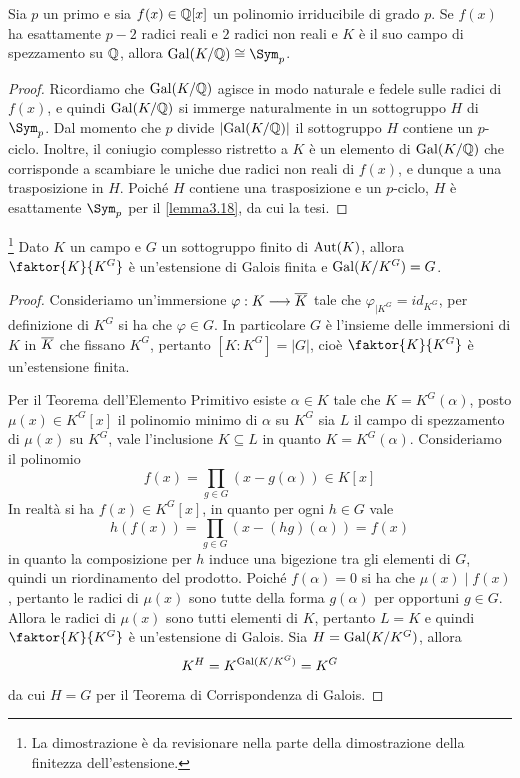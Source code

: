 \documentclass[11pt]{scrartcl}
\begin{document}
	\begin{lemma}
		\label{lemma3.19}
		Sia $p$ un primo e sia $f(x) \in \mathbb Q[x]$ un polinomio irriducibile di grado
		$p$. Se $f(x)$ ha esattamente $p - 2$ radici reali e $2$ radici non reali
		e $K$ è il suo campo di spezzamento su $\mathbb Q$, allora $\Gal(K/\QQ) \cong \Sym_p$.
	\end{lemma}
	
	\begin{proof}
		Ricordiamo che $\operatorname{Gal}(K/\mathbb Q)$ agisce in modo naturale e fedele sulle radici di
		$f(x)$, e quindi $\operatorname{Gal}(K/\mathbb Q)$ si immerge naturalmente in un sottogruppo
		$H$ di
		$\Sym_p$. Dal momento che $p$ divide $\left\lvert \operatorname{Gal}(K/\mathbb Q) \right\rvert$ il sottogruppo $H$
		contiene
		un $p$-ciclo. Inoltre, il coniugio complesso ristretto a $K$ è
		un elemento di $\operatorname{Gal}(K/\mathbb Q)$ che corrisponde a scambiare le uniche due
		radici non reali di $f(x)$, e dunque a una trasposizione in $H$. Poiché
		$H$ contiene una trasposizione e un $p$-ciclo,
		$H$ è esattamente $\Sym_p$ per il \autoref{lemma3.18}, da cui la tesi.
	\end{proof}
	
	\begin{lemma}
		\footnote{
			La dimostrazione è da revisionare nella parte della dimostrazione 
			della finitezza dell'estensione.
		}
		\label{lemma3.20}
		Dato $K$ un campo e $G$ un sottogruppo finito di $\operatorname{Aut}(K)$, allora 
		$\faktor{K}{K^G}$ è un'estensione di Galois finita e $\operatorname{Gal}(K/K^G) = G$.
	\end{lemma}
	
	\begin{proof}
		Consideriamo un'immersione $\varphi: K \longrightarrow \overline{K}$ tale che
		$\varphi_{\mid K^G} = id_{K^G}$, per definizione di $K^G$ si ha che 
		$\varphi \in G$. In particolare $G$ è l'insieme delle immersioni di $K$
		in $\overline{K}$ che fissano $K^G$, pertanto $[K:K^G] = |G|$, cioè $\faktor{K}{K^G}$
		è un'estensione finita. 
		
		Per il Teorema dell'Elemento Primitivo esiste $\alpha \in K$ tale che 
		$K = K^G(\alpha)$, posto $\mu(x) \in K^G[x]$ il polinomio minimo di $\alpha$
		su $K^G$ sia $L$ il campo di spezzamento di $\mu(x)$ su $K^G$, vale
		l'inclusione $K \subseteq L$ in quanto $K = K^G(\alpha)$. Consideriamo 
		il polinomio 
		\[
		f(x) = \prod_{g \in G}(x - g(\alpha)) \in K[x]
		\]
		In realtà si ha $f(x) \in K^G[x]$, in quanto per ogni $h \in G$ vale 
		\[
		h(f(x)) = \prod_{g \in G}(x - (hg)(\alpha)) = f(x)
		\]
		in quanto la composizione per $h$ induce una bigezione tra gli elementi di $G$,
		quindi un riordinamento del prodotto. Poiché $f(\alpha) = 0$ si ha che
		$\mu(x)\mid f(x)$, pertanto le radici di $\mu(x)$ sono tutte della forma
		$g(\alpha)$ per opportuni $g \in G$. Allora le radici di $\mu(x)$ sono
		tutti elementi di $K$, pertanto $L = K$ e quindi $\faktor{K}{K^G}$ è 
		un'estensione di Galois. Sia $H = \operatorname{Gal}(K/K^G)$, allora
		\[
		K^H = K^{\operatorname{Gal}(K/K^G)} = K^G
		\]
		da cui $H = G$ per il Teorema di Corrispondenza di Galois.
	\end{proof}
	
\end{document}

